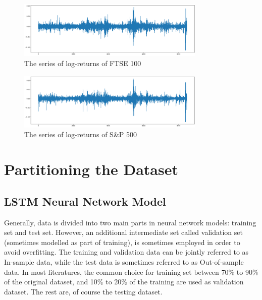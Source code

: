 \documentclass[a4paper,11pt,oneside]{book}
\begin{document}
\begin{figure}[!h]
	\centering
	\includegraphics[width=0.8\textwidth]{figures/logFTSE}
	\caption{The series of log-returns of FTSE 100}
	\label{logFTSE}
\end{figure}


\begin{figure}[!h]
	\centering
	\includegraphics[width=0.8\textwidth]{figures/logS&P500}
	\caption{The series of log-returns of S\&P 500}
	\label{logSandP 500}
\end{figure}

\section{Partitioning the Dataset}
\subsection{LSTM Neural Network Model}

Generally, data is divided into two main parts in neural network models: training set and test set. However, an additional intermediate set called validation set (sometimes modelled as part of training), is sometimes employed in order to avoid overfitting. The training and validation data can be jointly referred to as In-sample data, while the test data is sometimes referred to as Out-of-sample data. In most literatures, the common choice for training set between 70\% to 90\% of the original dataset, and 10\% to 20\% of the training are used as validation dataset. The rest are, of course the testing dataset. \newline\newline
\end{document}
